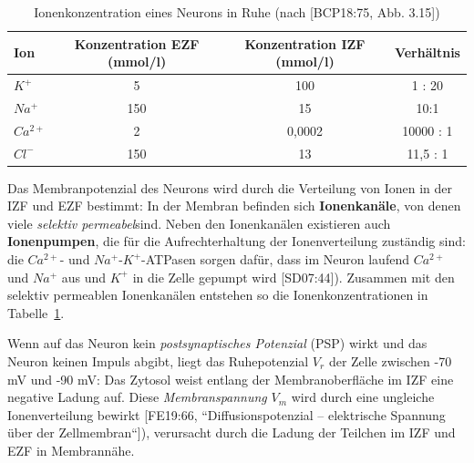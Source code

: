 {\renewcommand{\arraystretch}{1.5}%
\begin{table} %
 \centering
 \begin{tabular}{l | c | c | c }
  \textbf{Ion} & \textbf{Konzentration EZF (mmol/l)} & \textbf{Konzentration IZF (mmol/l)} & \textbf{Verhältnis} \\
  \hline
  $K^+$      & 5 & 100 & 1 : 20 \\
  $Na^+$     & 150 & 15 & 10:1 \\
  $Ca^{2+}$  & 2 & 0,0002 & 10000 : 1 \\
  $Cl^-$     & 150 & 13 & 11,5 : 1 \\
 \end{tabular}
 \caption{Ionenkonzentration eines Neurons in Ruhe (nach {[BCP18:75, Abb. 3.15]})}
 \label{tab:ionenkonzentration}
\end{table}


Das Membranpotenzial des Neurons wird durch die Verteilung von Ionen in der IZF und EZF bestimmt: In der Membran befinden sich \textbf{Ionenkanäle}, von denen viele \textit{selektiv permeabel}\footnotemark[20] sind.
Neben den Ionenkanälen existieren auch \textbf{Ionenpumpen}\footnotemark[21], die für die Aufrechterhaltung der Ionenverteilung zuständig sind: die $Ca^{2+}$- und $Na^+$-$K^+$-ATPasen sorgen dafür, dass im Neuron laufend  $Ca^{2+}$ und $Na^+$ aus und $K^+$ in die Zelle gepumpt wird [SD07:44]).
Zusammen mit den selektiv permeablen Ionenkanälen entstehen so die Ionenkonzentrationen in Tabelle~\ref{tab:ionenkonzentration}.\\



Wenn auf das Neuron kein \textit{postsynaptisches Potenzial} (PSP) wirkt und das Neuron keinen Impuls abgibt, liegt das Ruhepotenzial $V_r$ der Zelle zwischen -70 mV und -90 mV\footnotemark[22]: Das Zytosol weist entlang der Membranoberfläche im IZF eine negative Ladung auf\footnotemark[23].
Diese \textit{Membranspannung} $V_m$ wird durch eine ungleiche Ionenverteilung bewirkt [FE19:66, ``Diffusionspotenzial – elektrische Spannung über der Zellmembran``]), verursacht durch die Ladung der Teilchen im IZF und EZF in Membrannähe\footnotemark[24].


}
